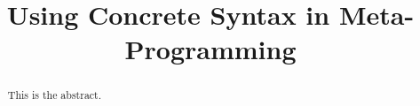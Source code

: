 \documentclass[a4paper,11pt]{article}
\title{Using Concrete Syntax in Meta-Programming}
\begin{document}
\maketitle


\begin{abstract}
This is the abstract.
\end{abstract}
\end{document}
